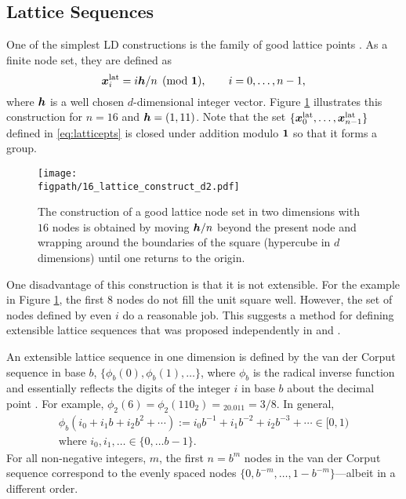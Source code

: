 \documentclass{svproc}
\newcommand{\figpath}{Figures}
\begin{document}
\subsection{Lattice Sequences} \label{sec:lattice}
One of the simplest LD constructions is the family of good lattice points \cite{DicEtal22a,SloJoe94}.  As a finite node set, they are defined as
\begin{equation} \label{eq:latticepts}
	{\boldsymbol{x}}_i^{\text{lat}} = i{\boldsymbol{h}}/n \pmod {{\boldsymbol{1}}}, \qquad i = 0, \ldots, n-1,
\end{equation}
where ${\boldsymbol{h}}$ is a well chosen $d$-dimensional integer vector. Figure \ref{fig:latticeconstruct} illustrates this construction for $n = 16$ and ${\boldsymbol{h}} = (1,11)$.  Note that the set $\{{\boldsymbol{x}}^{\text{lat}}_0, \ldots, {\boldsymbol{x}}^{\text{lat}}_{n-1}\}$ defined in \eqref{eq:latticepts} is closed under addition modulo ${\boldsymbol{1}}$ so that it forms a group.


\begin{figure}
	\centering
	\texttt{[image: \\figpath/16\_lattice\_construct\_d2.pdf]}
	\caption{The construction of a good lattice node set in two dimensions with $16$ nodes is obtained by moving ${\boldsymbol{h}}/n$ beyond the present node and wrapping around the boundaries of the square (hypercube in $d$ dimensions) until one returns to the origin. \label{fig:latticeconstruct}}
\end{figure}


One disadvantage of this construction is that it is not extensible. For the example in Figure \ref{fig:latticeconstruct}, the first $8$ nodes do not fill the unit square well.  However, the set of nodes defined by even $i$ do a reasonable job.  This suggests a method for defining extensible lattice sequences that was proposed independently in \cite{Mai81a} and \cite{HicEtal00}.

An extensible lattice sequence in one dimension is defined by the van der Corput sequence in base $b$, $\{\phi_b(0), \phi_b(1), \ldots\}$, where $\phi_b$ is the radical inverse function and essentially reflects the digits of the integer $i$ in base $b$ about the decimal point \cite[Chapter 3]{DicPil10a}. For example, $\phi_2(6) = \phi_2(110_{2}) = {}_20.011 = 3/8$.  In general,
\begin{multline} \label{eq:vdc}
	\phi_b(i_0 + i_1b + i_2 b^2 + \cdots ) := i_0 b^{-1} + i_1 b^{-2} + i_2 b^{-3} + \cdots \in [0,1)
	\\
	 \text{where } i_0, i_1, \ldots \in \{0,\ldots b-1\}.
\end{multline}
For all non-negative integers, $m$, the first $n = b^m$ nodes in the van der Corput sequence correspond to the evenly spaced nodes $\{0, b^{-m}, \ldots, 1 - b^{-m} \}$---albeit in a different order.
\end{document}
